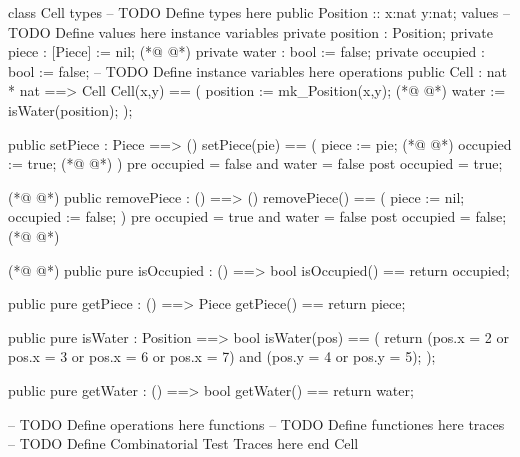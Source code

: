 \begin{vdmpp}[breaklines=true]
class Cell
types
-- TODO Define types here
 public Position :: x:nat y:nat;
values
-- TODO Define values here
instance variables
 private position : Position;
 private piece :  [Piece] := nil;
(*@
\label{Cell:10}
@*)
 private water : bool := false;
 private occupied : bool := false;
-- TODO Define instance variables here
operations
 public Cell : nat * nat ==> Cell
   Cell(x,y) ==
   (
    position := mk_Position(x,y);
(*@
\label{getPiece:18}
@*)
    water := isWater(position);
  );
 
 public setPiece : Piece ==> ()
 setPiece(pie) == 
 (
  piece := pie;
(*@
\label{isWater:25}
@*)
  occupied := true;
(*@
\label{setPiece:26}
@*)
 )
 pre occupied = false and water = false
 post occupied = true;
 
(*@
\label{removePiece:30}
@*)
 public removePiece : () ==> ()
 removePiece() == 
 (
  piece := nil;
  occupied := false;
 )
 pre occupied = true and water = false
 post occupied = false;
(*@
\label{getWater:38}
@*)
 
(*@
\label{isOccupied:39}
@*)
 public pure isOccupied : () ==> bool
 isOccupied() == return occupied;
 
 public pure getPiece : () ==> Piece
 getPiece() == return piece;
  
 public pure isWater : Position ==> bool
 isWater(pos) ==
 (
  return (pos.x = 2 or pos.x = 3 or pos.x = 6 or pos.x = 7) and (pos.y = 4 or pos.y = 5);
 );
 
 public pure getWater : () ==> bool
 getWater() == return water;
 
-- TODO Define operations here
functions
-- TODO Define functiones here
traces
-- TODO Define Combinatorial Test Traces here
end Cell
\end{vdmpp}
